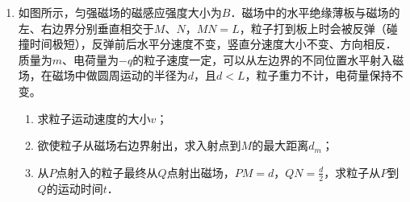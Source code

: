 \begin{enumerate}[leftmargin=0em]
{\begin{enumerate}
\end{enumerate}
}





\newpage
\item
{}
如图所示，匀强磁场的磁感应强度大小为$ B $．磁场中的水平绝缘薄板与磁场的左、右边界分别垂直相交于$ M $、$ N $，$ MN=L $，粒子打到板上时会被反弹（碰撞时间极短），反弹前后水平分速度不变，竖直分速度大小不变、方向相反．质量为$ m $、电荷量为$ -q $的粒子速度一定，可以从左边界的不同位置水平射入磁场，在磁场中做圆周运动的半径为$ d $，且$ d<L $，粒子重力不计，电荷量保持不变。
\begin{enumerate}
\renewcommand{\labelenumi}{\arabic{enumi}.}
\item
求粒子运动速度的大小$ v $；
\item 
欲使粒子从磁场右边界射出，求入射点到$ M $的最大距离$ d_m $；
\item 
从$ P $点射入的粒子最终从$ Q $点射出磁场，$ PM=d $，$ QN=\frac{d}{2} $，求粒子从$ P $到$ Q $的运动时间$ t $．



\end{enumerate}
\begin{figure}[h!]
\flushright

\end{figure}




\end{enumerate}




